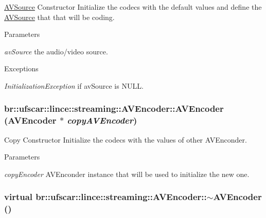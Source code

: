 \hyperlink{classbr_1_1ufscar_1_1lince_1_1streaming_1_1AVSource}{AVSource} Constructor Initialize the codecs with the default values and define the \hyperlink{classbr_1_1ufscar_1_1lince_1_1streaming_1_1AVSource}{AVSource} that that will be coding. 


\begin{DoxyParams}{Parameters}
\item[{\em avSource}]the audio/video source. \end{DoxyParams}

\begin{DoxyExceptions}{Exceptions}
\item[{\em InitializationException}]if avSource is NULL. \end{DoxyExceptions}
\hypertarget{classbr_1_1ufscar_1_1lince_1_1streaming_1_1AVEncoder_adf32dac88bc1e811c035c6f10c01922a}{
\subsubsection[{AVEncoder}]{\setlength{\rightskip}{0pt plus 5cm}br::ufscar::lince::streaming::AVEncoder::AVEncoder ({\bf AVEncoder} $\ast$ {\em copyAVEncoder})}}
\label{classbr_1_1ufscar_1_1lince_1_1streaming_1_1AVEncoder_adf32dac88bc1e811c035c6f10c01922a}


Copy Constructor Initialize the codecs with the values of other AVEnconder. 


\begin{DoxyParams}{Parameters}
\item[{\em copyEncoder}]AVEnconder instance that will be used to initialize the new one. \end{DoxyParams}
\hypertarget{classbr_1_1ufscar_1_1lince_1_1streaming_1_1AVEncoder_a59a61a954519164050cd6a6344434ef9}{
\subsubsection[{$\sim$AVEncoder}]{\setlength{\rightskip}{0pt plus 5cm}virtual br::ufscar::lince::streaming::AVEncoder::$\sim$AVEncoder ()}}
\label{classbr_1_1ufscar_1_1lince_1_1streaming_1_1AVEncoder_a59a61a954519164050cd6a6344434ef9}


